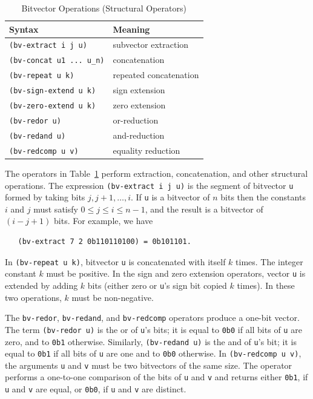 \documentclass[11pt,twoside,fleqn,openright,titlepage]{cslreport}
\begin{document}
\begin{table}
\begin{small}
\begin{center}
\begin{tabular}{|p{5cm}|l|}
\hline
Syntax & Meaning \\
\hline
\texttt{(bv-extract i j u)} & subvector extraction \\
\texttt{(bv-concat u1 ... u\_n)} & concatenation \\
\texttt{(bv-repeat u k)} & repeated concatenation \\
\texttt{(bv-sign-extend u k)} & sign extension \\
\texttt{(bv-zero-extend u k)} & zero extension \\
\hline
\texttt{(bv-redor u)} & or-reduction \\
\texttt{(bv-redand u)} & and-reduction \\
\texttt{(bv-redcomp u v)} & equality reduction \\
\hline
\end{tabular}
\end{center}
\end{small}
\caption{Bitvector Operations (Structural Operators)}
\label{bitvectors3}
\end{table}

The operators in Table~\ref{bitvectors3} perform extraction,
concatenation, and other structural operations. The expression
\texttt{(bv-extract i j u)} is the segment of bitvector \texttt{u}
formed by taking bits $j, j+1, \ldots, i$. If \texttt{u} is a
bitvector of $n$ bits then the constants $i$ and $j$ must satisfy $0
\leq j \leq i \leq n-1$, and the result is a bitvector of $(i - j +
1)$ bits. For example, we have
\begin{small}
\begin{verbatim}
   (bv-extract 7 2 0b110110100) = 0b101101.
\end{verbatim}
\end{small}

\medskip\noindent
In \texttt{(bv-repeat u k)}, bitvector \texttt{u} is concatenated with
itself $k$ times. The integer constant $k$ must be positive. In the
sign and zero extension operators, vector \texttt{u} is extended by
adding $k$ bits (either zero or \texttt{u}'s sign bit copied $k$
times).  In these two operations, $k$ must be non-negative.

\medskip\noindent
The \texttt{bv-redor}, \texttt{bv-redand}, and \texttt{bv-redcomp}
operators produce a one-bit vector.  The term \texttt{(bv-redor u)} is
the or of \texttt{u}'s bits; it is equal to \texttt{0b0} if all bits
of \texttt{u} are zero, and to \texttt{0b1} otherwise. Similarly,
\texttt{(bv-redand u)} is the and of \texttt{u}'s bit; it is equal to
\texttt{0b1} if all bits of \texttt{u} are one and to \texttt{0b0}
otherwise. In \texttt{(bv-redcomp u v)}, the arguments \texttt{u} and
\texttt{v} must be two bitvectors of the same size. The operator
performs a one-to-one comparison of the bits of \texttt{u} and
\texttt{v} and returns either \texttt{0b1}, if \texttt{u} and
\texttt{v} are equal, or \texttt{0b0}, if \texttt{u} and \texttt{v}
are distinct.
\end{document}
